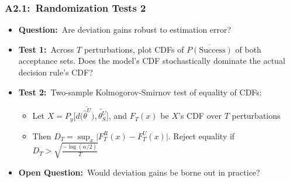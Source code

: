 \documentclass[12pt, aspectratio=169]{beamer}
\begin{document}
\begin{frame}[label=rt2]
\frametitle{A2.1:\ Randomization Tests 2}
\begin{itemize}
\item \textbf{Question:}\ Are deviation gains robust to estimation error?
\vspace{10pt}
\item \textbf{Test 1:}\ Across $T$ perturbations, plot CDFs of $\overline{P(\text{Success})}$ of both acceptance sets. Does the model's CDF stochastically dominate the actual decision rule's CDF?
\vspace{10pt}
\item \textbf{Test 2:}\ Two-sample Kolmogorov-Smirnov test of equality of CDFs:
\vspace{5pt}
\begin{itemize}
\item Let $X=\overline{P_y\big[d\big(\hat\theta^U\big),\widetilde{\theta_S^U}\big]}$, and $F_T(x)$ be $X$'s CDF over $T$ perturbations
\vspace{5pt}
\item Then $D_T = \sup_x \big|F_T^R(x)-F_T^U(x)\big|$. Reject equality if $D_T > \sqrt{\frac{-\log{(\alpha/2)}}{T}}$
\end{itemize}
\vspace{10pt}
\item \textbf{Open Question:}\ Would deviation gains be borne out in practice?
\vspace{10pt}
\end{itemize}
\hyperlink{dgi}{}
\end{frame}
\end{document}
